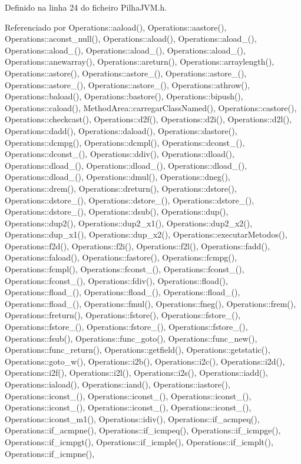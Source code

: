 Definido na linha 24 do ficheiro Pilha\+J\+V\+M.\+h.



Referenciado por Operations\+::aaload(), Operations\+::aastore(), Operations\+::aconst\+\_\+null(), Operations\+::aload(), Operations\+::aload\+\_(), Operations\+::aload\+\_(), Operations\+::aload\+\_(), Operations\+::aload\+\_(), Operations\+::anewarray(), Operations\+::areturn(), Operations\+::arraylength(), Operations\+::astore(), Operations\+::astore\+\_(), Operations\+::astore\+\_(), Operations\+::astore\+\_(), Operations\+::astore\+\_(), Operations\+::athrow(), Operations\+::baload(), Operations\+::bastore(), Operations\+::bipush(), Operations\+::caload(), Method\+Area\+::carregar\+Class\+Named(), Operations\+::castore(), Operations\+::checkcast(), Operations\+::d2f(), Operations\+::d2i(), Operations\+::d2l(), Operations\+::dadd(), Operations\+::daload(), Operations\+::dastore(), Operations\+::dcmpg(), Operations\+::dcmpl(), Operations\+::dconst\+\_(), Operations\+::dconst\+\_(), Operations\+::ddiv(), Operations\+::dload(), Operations\+::dload\+\_(), Operations\+::dload\+\_(), Operations\+::dload\+\_(), Operations\+::dload\+\_(), Operations\+::dmul(), Operations\+::dneg(), Operations\+::drem(), Operations\+::dreturn(), Operations\+::dstore(), Operations\+::dstore\+\_(), Operations\+::dstore\+\_(), Operations\+::dstore\+\_(), Operations\+::dstore\+\_(), Operations\+::dsub(), Operations\+::dup(), Operations\+::dup2(), Operations\+::dup2\+\_\+x1(), Operations\+::dup2\+\_\+x2(), Operations\+::dup\+\_\+x1(), Operations\+::dup\+\_\+x2(), Operations\+::executar\+Metodos(), Operations\+::f2d(), Operations\+::f2i(), Operations\+::f2l(), Operations\+::fadd(), Operations\+::faload(), Operations\+::fastore(), Operations\+::fcmpg(), Operations\+::fcmpl(), Operations\+::fconst\+\_(), Operations\+::fconst\+\_(), Operations\+::fconst\+\_(), Operations\+::fdiv(), Operations\+::fload(), Operations\+::fload\+\_(), Operations\+::fload\+\_(), Operations\+::fload\+\_(), Operations\+::fload\+\_(), Operations\+::fmul(), Operations\+::fneg(), Operations\+::frem(), Operations\+::freturn(), Operations\+::fstore(), Operations\+::fstore\+\_(), Operations\+::fstore\+\_(), Operations\+::fstore\+\_(), Operations\+::fstore\+\_(), Operations\+::fsub(), Operations\+::func\+\_\+goto(), Operations\+::func\+\_\+new(), Operations\+::func\+\_\+return(), Operations\+::getfield(), Operations\+::getstatic(), Operations\+::goto\+\_\+w(), Operations\+::i2b(), Operations\+::i2c(), Operations\+::i2d(), Operations\+::i2f(), Operations\+::i2l(), Operations\+::i2s(), Operations\+::iadd(), Operations\+::iaload(), Operations\+::iand(), Operations\+::iastore(), Operations\+::iconst\+\_(), Operations\+::iconst\+\_(), Operations\+::iconst\+\_(), Operations\+::iconst\+\_(), Operations\+::iconst\+\_(), Operations\+::iconst\+\_(), Operations\+::iconst\+\_\+m1(), Operations\+::idiv(), Operations\+::if\+\_\+acmpeq(), Operations\+::if\+\_\+acmpne(), Operations\+::if\+\_\+icmpeq(), Operations\+::if\+\_\+icmpge(), Operations\+::if\+\_\+icmpgt(), Operations\+::if\+\_\+icmple(), Operations\+::if\+\_\+icmplt(), Operations\+::if\+\_\+icmpne(), 